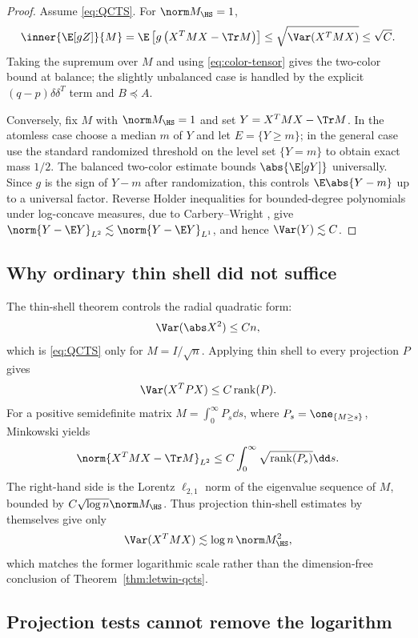 \documentclass[../../main.tex]{subfiles}
\begin{document}
\begin{proof}
Assume \eqref{eq:QCTS}. For $\norm M_{\HS}=1$,
\[
  \inner{\E[gZ]}{M}
  =\E\left[g\left(X^TMX-\Tr M\right)\right]
  \le \sqrt{\Var(X^TMX)}\le\sqrt C .
\]
Taking the supremum over $M$ and using \eqref{eq:color-tensor} gives the two-color bound at balance;
the slightly unbalanced case is handled by the explicit $(q-p)\delta\delta^T$ term and
$B\preceq A$.

Conversely, fix $M$ with $\norm M_{\HS}=1$ and set $Y=X^TMX-\Tr M$. In the atomless case choose a
median $m$ of $Y$ and let $E=\{Y\ge m\}$; in the general case use the standard randomized threshold
on the level set $\{Y=m\}$ to obtain exact mass $1/2$. The balanced two-color estimate bounds
$\abs{\E[gY]}$ universally. Since $g$ is the sign of $Y-m$ after randomization, this controls
$\E\abs{Y-m}$ up to a universal factor. Reverse Holder inequalities for bounded-degree polynomials
under log-concave measures, due to Carbery--Wright \cite{CarberyWright2001}, give
$\norm{Y-\E Y}_{L^2}\lesssim\norm{Y-\E Y}_{L^1}$, and hence $\Var(Y)\lesssim C$.
\end{proof}

\subsection{Why ordinary thin shell did not suffice}

The thin-shell theorem controls the radial quadratic form:
\[
  \Var(\abs X^2)\le Cn,
\]
which is \eqref{eq:QCTS} only for $M=I/\sqrt n$. Applying thin shell to every projection $P$ gives
\[
  \Var(X^TPX)\le C\operatorname{rank}(P).
\]
For a positive semidefinite matrix $M=\int_0^\infty P_s\dd s$, where
$P_s=\one_{\{M\ge s\}}$, Minkowski yields
\[
  \norm{X^TMX-\Tr M}_{L^2}
  \le C\int_0^\infty\sqrt{\operatorname{rank}(P_s)}\dd s.
\]
The right-hand side is the Lorentz $\ell_{2,1}$ norm of the eigenvalue sequence of $M$, bounded by
$C\sqrt{\log n}\norm M_{\HS}$. Thus projection thin-shell estimates by themselves give only
\begin{equation}\label{eq:qcts-log}
  \Var(X^TMX)\lesssim \log n\,\norm M_{\HS}^2,
\end{equation}
which matches the former logarithmic scale rather than the dimension-free conclusion of
Theorem~\ref{thm:letwin-qcts}.

\subsection{Projection tests cannot remove the logarithm}
\end{document}
